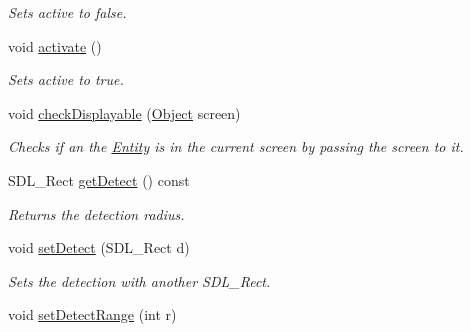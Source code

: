\begin{DoxyCompactItemize}
\begin{DoxyCompactList}\small\item\em Sets active to false. \end{DoxyCompactList}\item 
void \hyperlink{classEntity_a95079be1c9fa9f109dd3cf7446eeeb1d}{activate} ()\hypertarget{classEntity_a95079be1c9fa9f109dd3cf7446eeeb1d}{}\label{classEntity_a95079be1c9fa9f109dd3cf7446eeeb1d}

\begin{DoxyCompactList}\small\item\em Sets active to true. \end{DoxyCompactList}\item 
void \hyperlink{classEntity_a63aac9638f79f0608b08f28b8cdc718e}{check\+Displayable} (\hyperlink{classObject}{Object} screen)\hypertarget{classEntity_a63aac9638f79f0608b08f28b8cdc718e}{}\label{classEntity_a63aac9638f79f0608b08f28b8cdc718e}

\begin{DoxyCompactList}\small\item\em Checks if an the \hyperlink{classEntity}{Entity} is in the current screen by passing the screen to it. \end{DoxyCompactList}\item 
S\+D\+L\+\_\+\+Rect \hyperlink{classEntity_a62073e91ee6f63f4b9a7e1512cda2e46}{get\+Detect} () const \hypertarget{classEntity_a62073e91ee6f63f4b9a7e1512cda2e46}{}\label{classEntity_a62073e91ee6f63f4b9a7e1512cda2e46}

\begin{DoxyCompactList}\small\item\em Returns the detection radius. \end{DoxyCompactList}\item 
void \hyperlink{classEntity_a7624a9b21bbb1bd97d7f2eac20339a82}{set\+Detect} (S\+D\+L\+\_\+\+Rect d)\hypertarget{classEntity_a7624a9b21bbb1bd97d7f2eac20339a82}{}\label{classEntity_a7624a9b21bbb1bd97d7f2eac20339a82}

\begin{DoxyCompactList}\small\item\em Sets the detection with another S\+D\+L\+\_\+\+Rect. \end{DoxyCompactList}\item 
void \hyperlink{classEntity_a884a7f8a537f3d0e926dfedb8e88a740}{set\+Detect\+Range} (int r)\hypertarget{classEntity_a884a7f8a537f3d0e926dfedb8e88a740}{}\label{classEntity_a884a7f8a537f3d0e926dfedb8e88a740}


\end{DoxyCompactItemize}
